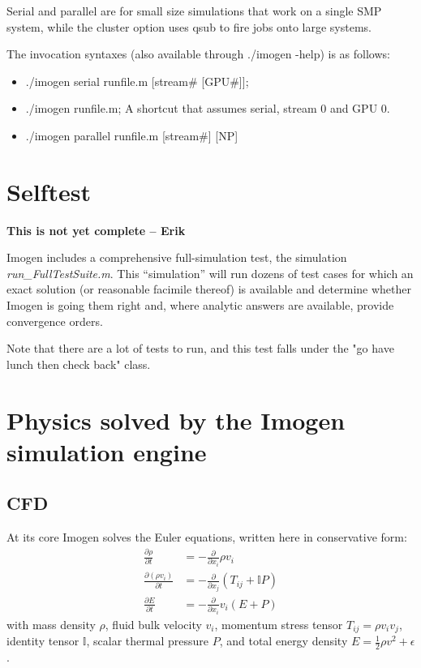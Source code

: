 \documentclass[letterpaper,12pt]{article}
\begin{document}
Serial and parallel are for small size simulations that work on a single SMP system,
while the cluster option uses qsub to fire jobs onto large systems.

The invocation syntaxes (also available through ./imogen -help) is as follows:
\begin{itemize}
\item ./imogen serial runfile.m [stream\# [GPU\#]];
\item ./imogen runfile.m; A shortcut that assumes serial, stream 0 and GPU 0.
\item ./imogen parallel runfile.m [stream\#] [NP]
\end{itemize}

\section{Selftest}

\textbf{This is not yet complete -- Erik}

Imogen includes a comprehensive full-simulation test, the simulation
\textit{run\_FullTestSuite.m}. This ``simulation'' will run dozens of test cases
for which an exact solution (or reasonable facimile thereof) is available
and determine whether Imogen is going them right and, where analytic answers
are available, provide convergence orders.

Note that there are a lot of tests to run, and this test falls under the "go have
lunch then check back" class.

\section{Physics solved by the Imogen simulation engine}

\subsection{CFD}

At its core Imogen solves the Euler equations, written here in conservative form:
\begin{align*}
\frac{\partial \rho}{\partial t} &= -\frac{\partial}{\partial x_i} \rho v_i \\
\frac{\partial (\rho v_i)}{\partial t} &= -\frac{\partial}{\partial x_j} (T_{ij} + \mathbb{I} P) \\
\frac{\partial E}{\partial t} &= -\frac{\partial}{\partial x_i} v_i (E + P)
\end{align*}
with mass density $\rho$, fluid bulk velocity $v_i$, momentum stress tensor
$T_{ij} = \rho v_i v_j$, identity tensor $\mathbb{I}$, scalar thermal pressure $P$,
and total energy density $E = \frac{1}{2} \rho v^2 + \epsilon$.
\end{document}
